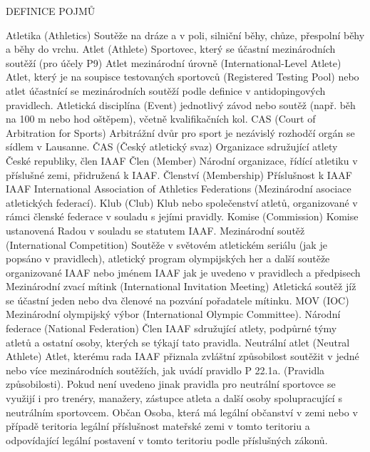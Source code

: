 

\nonum\chap DEFINICE POJMŮ

\dt Atletika (Athletics)
\dd Soutěže na dráze a v poli, silniční běhy, chůze, přespolní běhy a běhy do vrchu.
\dend
\dt Atlet (Athlete)
\dd Sportovec, který se účastní mezinárodních soutěží (pro účely P9)
\dend
\dt Atlet mezinárodní úrovně (International-Level Atlete)
\dd Atlet, který je na soupisce testovaných sportovců (Registered Testing Pool) nebo atlet účastnící se mezinárodních soutěží podle definice v antidopingových pravidlech.
\dend
\dt Atletická disciplína (Event)
\dd jednotlivý závod nebo soutěž (např. běh na 100 m nebo hod oštěpem), včetně kvalifikačních kol.
\dend
\dt CAS (Court of Arbitration for Sports)
\dd Arbitrážní dvůr pro sport je nezávislý rozhodčí orgán se sídlem v Lausanne.
\dend
\dt ČAS (Český atletický svaz)
\dd Organizace sdružující atlety České republiky, člen IAAF
\dend
\dt Člen (Member)
\dd Národní organizace, řídící atletiku v příslušné zemi, přidružená k IAAF.
\dend
\dt Členství (Membership)
\dd Příslušnost k IAAF
\dend
\dt IAAF
\dd International Association of Athletics Federations (Mezinárodní asociace atletických federací).
\dend
\dt Klub (Club)
\dd Klub nebo společenství atletů, organizované v rámci členské federace v souladu s jejími pravidly.
\dend
\dt Komise (Commission)
\dd Komise ustanovená Radou v souladu se statutem IAAF.
\dend
\dt Mezinárodní soutěž (International Competition)
\dd Soutěže v světovém atletickém seriálu (jak je popsáno v pravidlech), atletický program olympijských her a další soutěže organizované IAAF nebo jménem IAAF jak je uvedeno v pravidlech a předpisech
\dend
\dt Mezinárodní zvací mítink (International Invitation Meeting)
\dd Atletická soutěž jíž se účastní jeden nebo dva členové na pozvání pořadatele mítinku.
\dend
\dt MOV (IOC)
\dd Mezinárodní olympijský výbor (International Olympic Committee).
\dend
\dt Národní federace (National Federation)
\dd Člen IAAF sdružující atlety, podpůrné týmy atletů a ostatní osoby, kterých se týkají tato pravidla.
\dend
\dt Neutrální atlet (Neutral Athlete)
\dd Atlet, kterému rada IAAF přiznala zvláštní způsobilost soutěžit v jedné nebo více mezinárodních soutěžích, jak uvádí pravidlo P 22.1a. (Pravidla způsobilosti). Pokud není uvedeno jinak pravidla pro neutrální sportovce se využijí i pro trenéry, manažery, zástupce atleta a další osoby spolupracující s neutrálním sportovcem.
\dend
\dt Občan
\dd Osoba, která má legální občanství v zemi nebo v případě teritoria legální příslušnost mateřské zemi v tomto teritoriu a odpovídající legální postavení v tomto teritoriu podle příslušných zákonů.
